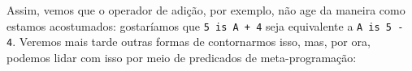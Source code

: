 \documentclass{article}
\theoremstyle{remark}
\theoremstyle{theorem}
\begin{document}
Assim, vemos que o operador de adição, por exemplo, não age da maneira como estamos acostumados: gostaríamos que {\tt 5 is A + 4} seja equivalente a {\tt A is 5 - 4}. Veremos mais tarde outras formas de contornarmos isso, mas, por ora, podemos lidar com isso por meio de predicados de meta-programação:
\\


\end{document}
